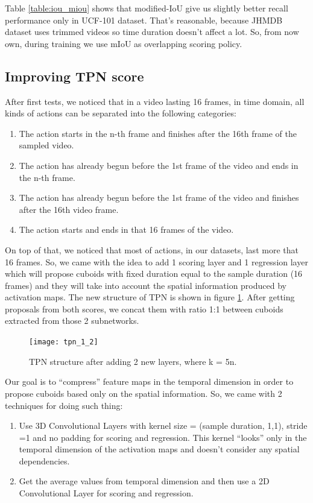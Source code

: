 Table \ref{table:iou_miou} shows that modified-IoU give us slightly better recall performance only in UCF-101 dataset. That's reasonable, because JHMDB dataset
uses trimmed videos so time duration doesn't affect a lot. So, from now own, during training we use mIoU as overlapping scoring policy.

\subsection{Improving TPN score}
After first tests, we noticed that in a video lasting 16 frames, in time domain, all kinds of actions can be separated into the following categories:
\begin{enumerate}
\item The action starts in the n-th  frame and finishes after the 16th frame of the sampled video.
\item The action has already begun before the 1st frame of the video and ends in the n-th frame.
\item The action has already begun before the 1st frame of the video and finishes after the 16th video frame.
\item The action starts and ends in that 16 frames of the video.
\end{enumerate}

On top of that, we noticed that most of actions, in our datasets, last more that 16 frames. So, we came with the idea to add  1 scoring layer and 1 regression layer
which will propose cuboids with fixed duration equal to the sample duration (16 frames) and they will take into account the spatial information produced by activation maps.
The new structure of TPN is shown in figure \ref{fig:tpn_1_2}. After getting proposals from both scores, we concat them with ratio 1:1 between cuboids extracted
from those 2 subnetworks.

\begin{figure}[h]
  \centering
  \texttt{[image: tpn\_1\_2]}
  \caption{TPN structure after adding 2 new layers, where k = 5n.}
  \label{fig:tpn_1_2}
\end{figure}
Our goal is to ``compress'' feature maps in the temporal dimension in order to propose cuboids based only on the spatial information.
So, we came with 2 techniques for doing such thing:
\begin{enumerate}
\item Use 3D Convolutional Layers with kernel size = (sample duration, 1,1), stride =1 and no padding for scoring and regression.
  This kernel ``looks'' only in the temporal dimension of the activation maps and doesn't consider any spatial dependencies.
\item Get the average values from temporal dimension and then use a 2D Convolutional Layer for scoring and regression.
\end{enumerate}

